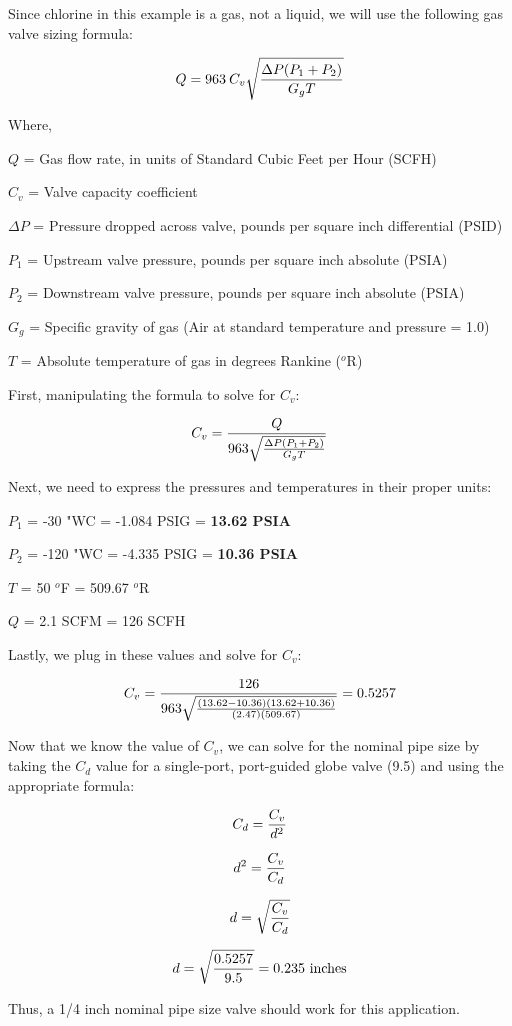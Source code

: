 \vskip 10pt







Since chlorine in this example is a gas, not a liquid, we will use the following gas valve sizing formula:

$$Q = 963 \> C_v \sqrt{{\Delta P (P_1 + P_2)} \over {G_g T}}$$

\noindent
Where,

$Q$ = Gas flow rate, in units of Standard Cubic Feet per Hour (SCFH)

$C_v$ = Valve capacity coefficient

$\Delta P$ = Pressure dropped across valve, pounds per square inch differential (PSID)

$P_1$ = Upstream valve pressure, pounds per square inch absolute (PSIA)

$P_2$ = Downstream valve pressure, pounds per square inch absolute (PSIA)

$G_g$ = Specific gravity of gas (Air at standard temperature and pressure = 1.0)

$T$ = Absolute temperature of gas in degrees Rankine ($^{o}$R)

\vskip 10pt

First, manipulating the formula to solve for $C_v$:

$$C_v = {Q \over 963 \sqrt{{\Delta P (P_1 + P_2)} \over {G_g T}}}$$

Next, we need to express the pressures and temperatures in their proper units:

\vskip 10pt

$P_1$ = -30 "WC = -1.084 PSIG = {\bf 13.62 PSIA}

\vskip 10pt

$P_2$ = -120 "WC = -4.335 PSIG = {\bf 10.36 PSIA}

\vskip 10pt

$T$ = 50 $^{o}$F = 509.67 $^{o}$R 

\vskip 10pt

$Q$ = 2.1 SCFM = 126 SCFH 

\vskip 10pt

Lastly, we plug in these values and solve for $C_v$:

$$C_v = {126 \over 963 \sqrt{{(13.62 - 10.36) (13.62 + 10.36)} \over {(2.47) (509.67)}}} = 0.5257$$

Now that we know the value of $C_v$, we can solve for the nominal pipe size by taking the $C_d$ value for a single-port, port-guided globe valve (9.5) and using the appropriate formula:

$$C_d = {C_v \over d^2}$$

$$d^2 = {C_v \over C_d}$$

$$d = \sqrt{C_v \over C_d}$$

$$d = \sqrt{0.5257 \over 9.5} = 0.235 \hbox{ inches}$$

Thus, a 1/4 inch nominal pipe size valve should work for this application.




